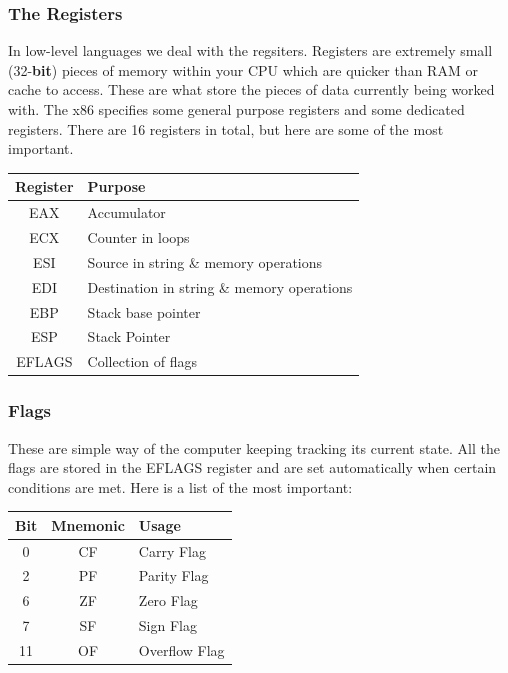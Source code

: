 \documentclass{beamer}
\begin{document}
	\begin{frame}
		\frametitle{The Registers}
		
		In low-level languages we deal with the regsiters. Registers are extremely small (32-\textbf{bit}) pieces of memory within your CPU which are quicker than RAM or cache to access. These are what store the pieces of data currently being worked with. The x86 specifies some general purpose registers and some dedicated registers. There are 16 registers in total, but here are some of the most important. 
		\newline
		
		\begin{tabular}{|c|l|}
			\hline
			\textbf{Register} & \textbf{Purpose} \\
			\hline
			\hline
			EAX & Accumulator\\
			\hline
			ECX & Counter in loops\\
			\hline
			ESI & Source in string \& memory operations\\
			\hline
			EDI & Destination in string \& memory operations\\
			\hline
			EBP & Stack base pointer\\
			\hline
			ESP & Stack Pointer\\
			\hline
			EFLAGS & Collection of flags \\
			\hline
		\end{tabular}
	\end{frame}
	
	\begin{frame}
		\frametitle{Flags}
		
		These are simple way of the computer keeping tracking its current state. All the flags are stored in the EFLAGS register and are set automatically when certain conditions are met. Here is a list of the most important: 
		\newline
		
		\begin{tabular}{|c|c|l|}
			\hline
			\textbf{Bit} & \textbf{Mnemonic} & \textbf{Usage} \\
			\hline
			\hline
			0 & CF & Carry Flag\\
			\hline
			2 & PF & Parity Flag\\
			\hline
			6 & ZF & Zero Flag\\
			\hline
			7 & SF & Sign Flag\\
			\hline
			11 & OF & Overflow Flag\\
			\hline
		\end{tabular}
		
	\end{frame}
	
\end{document}
